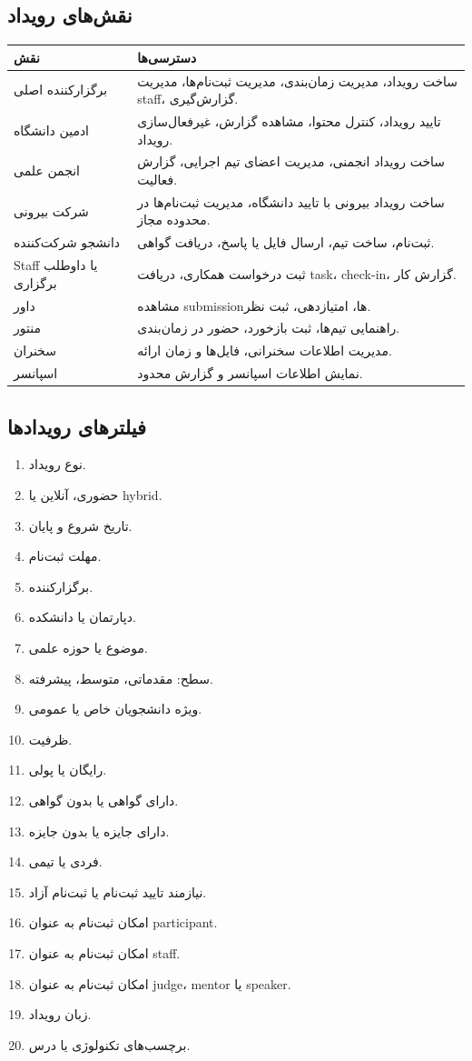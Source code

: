 \documentclass[12pt,a4paper]{article}
\begin{document}
\subsection{نقش‌های رویداد}
\begin{longtable}{p{}p{}}
\toprule
\textbf{نقش} & \textbf{دسترسی‌ها}\\
\midrule
برگزارکننده اصلی & ساخت رویداد، مدیریت زمان‌بندی، مدیریت ثبت‌نام‌ها، مدیریت staff، گزارش‌گیری.\\
ادمین دانشگاه & تایید رویداد، کنترل محتوا، مشاهده گزارش، غیرفعال‌سازی رویداد.\\
انجمن علمی & ساخت رویداد انجمنی، مدیریت اعضای تیم اجرایی، گزارش فعالیت.\\
شرکت بیرونی & ساخت رویداد بیرونی با تایید دانشگاه، مدیریت ثبت‌نام‌ها در محدوده مجاز.\\
دانشجو شرکت‌کننده & ثبت‌نام، ساخت تیم، ارسال فایل یا پاسخ، دریافت گواهی.\\
Staff یا داوطلب برگزاری & ثبت درخواست همکاری، دریافت task، check-in، گزارش کار.\\
داور & مشاهده submissionها، امتیازدهی، ثبت نظر.\\
منتور & راهنمایی تیم‌ها، ثبت بازخورد، حضور در زمان‌بندی.\\
سخنران & مدیریت اطلاعات سخنرانی، فایل‌ها و زمان ارائه.\\
اسپانسر & نمایش اطلاعات اسپانسر و گزارش محدود.\\
\bottomrule
\end{longtable}

\subsection{فیلترهای رویدادها}
\begin{enumerate}
\item نوع رویداد.
\item حضوری، آنلاین یا hybrid.
\item تاریخ شروع و پایان.
\item مهلت ثبت‌نام.
\item برگزارکننده.
\item دپارتمان یا دانشکده.
\item موضوع یا حوزه علمی.
\item سطح: مقدماتی، متوسط، پیشرفته.
\item ویژه دانشجویان خاص یا عمومی.
\item ظرفیت.
\item رایگان یا پولی.
\item دارای گواهی یا بدون گواهی.
\item دارای جایزه یا بدون جایزه.
\item فردی یا تیمی.
\item نیازمند تایید ثبت‌نام یا ثبت‌نام آزاد.
\item امکان ثبت‌نام به عنوان participant.
\item امکان ثبت‌نام به عنوان staff.
\item امکان ثبت‌نام به عنوان judge، mentor یا speaker.
\item زبان رویداد.
\item برچسب‌های تکنولوژی یا درس.
\end{enumerate}
\end{document}
